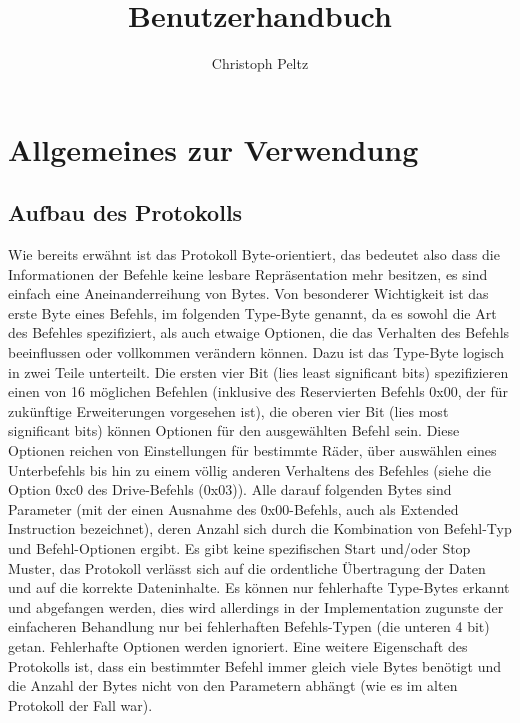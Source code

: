 \documentclass[a4paper]{article}
\title{Benutzerhandbuch}
\author{Christoph Peltz}
\begin{document}
\maketitle
\pagebreak
\tableofcontents
\pagebreak
	\section{Allgemeines zur Verwendung}


	\subsection{Aufbau des Protokolls}

	Wie bereits erwähnt ist das Protokoll Byte-orientiert, das bedeutet also dass die Informationen der Befehle keine
	lesbare Repräsentation mehr besitzen, es sind einfach eine Aneinanderreihung von Bytes. Von besonderer Wichtigkeit
	ist das erste Byte eines Befehls, im folgenden Type-Byte genannt, da es sowohl die Art des Befehles spezifiziert, als
	auch etwaige Optionen, die das Verhalten des Befehls beeinflussen oder vollkommen verändern können. Dazu ist das Type-Byte
	logisch in zwei Teile unterteilt. Die ersten vier Bit (lies least significant bits) spezifizieren einen von 16 möglichen
	Befehlen (inklusive des Reservierten Befehls 0x00, der für zukünftige Erweiterungen vorgesehen ist), die oberen vier Bit 
	(lies most significant bits) können Optionen für den ausgewählten Befehl sein. Diese Optionen reichen von Einstellungen
	für bestimmte Räder, über auswählen eines Unterbefehls bis hin zu einem völlig anderen Verhaltens des Befehles (siehe
	die Option 0xc0 des Drive-Befehls (0x03)). Alle darauf folgenden Bytes sind Parameter (mit der einen Ausnahme des
	0x00-Befehls, auch als Extended Instruction bezeichnet), deren Anzahl sich durch die Kombination von Befehl-Typ und
	Befehl-Optionen ergibt.
	Es gibt keine spezifischen Start und/oder Stop Muster, das Protokoll verlässt sich auf die ordentliche Übertragung
	der Daten und auf die korrekte Dateninhalte. Es können nur fehlerhafte Type-Bytes erkannt und abgefangen werden, dies wird
	allerdings in der Implementation zugunste der einfacheren Behandlung nur bei fehlerhaften Befehls-Typen (die unteren 4 bit) getan.
	Fehlerhafte Optionen werden ignoriert.
	Eine weitere Eigenschaft des Protokolls ist, dass ein bestimmter Befehl immer gleich viele Bytes benötigt und die Anzahl
	der Bytes nicht von den Parametern abhängt (wie es im alten Protokoll der Fall war).
\end{document}
